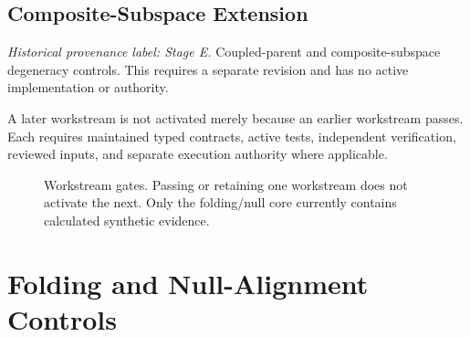 \documentclass[11pt]{article}
\begin{document}
\subsection{Composite-Subspace Extension}
\noindent\textit{Historical provenance label: Stage E.}
Coupled-parent and composite-subspace degeneracy controls.  This requires a separate
revision and has no active implementation or authority.

A later workstream is not activated merely because an earlier workstream passes.  Each
requires maintained typed contracts, active tests, independent verification, reviewed
inputs, and separate execution authority where applicable.

\begin{figure}[htbp]
  \centering
  \caption{Workstream gates.  Passing or retaining one workstream does not activate the
  next.  Only the folding/null core currently contains calculated synthetic evidence.}
  \label{fig:workstream-gates}
\end{figure}

\section{Folding and Null-Alignment Controls}
\end{document}
